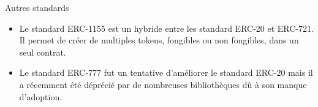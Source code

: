 \begin{frame}{Autres standards}
  \begin{itemize}
    \item Le standard ERC-1155 est un hybride entre les standard ERC-20 et ERC-721. Il permet de créer de multiples tokens, fongibles ou non fongibles, dans un seul contrat.
    \item Le standard ERC-777 fut un tentative d'améliorer le standard ERC-20 mais il a récemment été déprécié par de nombreuses bibliothèques dû à son manque d'adoption.
  \end{itemize}
\end{frame}